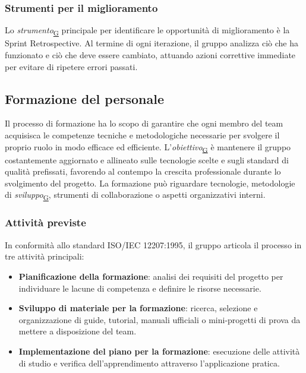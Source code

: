 \documentclass[a4paper,12pt]{article}
\begin{document}
        \subsubsection{Strumenti per il miglioramento}
        Lo \textit{strumento}\textsubscript{\href{https://atlasteam9.github.io/Atlas/glossario.html\#Strumento}{G}} principale per identificare le opportunità di miglioramento è la Sprint Retrospective. Al termine di ogni iterazione, il gruppo analizza ciò che ha funzionato e ciò che deve essere cambiato, attuando azioni correttive immediate per evitare di ripetere errori passati.
        
    \subsection{Formazione del personale}
        Il processo di formazione ha lo scopo di garantire che ogni membro del team acquisisca le competenze tecniche e metodologiche necessarie per svolgere il proprio ruolo in modo efficace ed efficiente. L'\textit{obiettivo}\textsubscript{\href{https://atlasteam9.github.io/Atlas/glossario.html\#Obiettivo}{G}} è mantenere il gruppo costantemente aggiornato e allineato sulle tecnologie scelte e sugli standard di qualità prefissati, favorendo al contempo la crescita professionale durante lo svolgimento del progetto. La formazione può riguardare tecnologie, metodologie di \textit{sviluppo}\textsubscript{\href{https://atlasteam9.github.io/Atlas/glossario.html\#Sviluppo}{G}}, strumenti di collaborazione o aspetti organizzativi interni.

        \subsubsection{Attività previste}
             In conformità allo standard ISO/IEC 12207:1995, il gruppo articola il processo in tre attività principali:
             \begin{itemize}
                 \item \textbf{Pianificazione della formazione}: analisi dei requisiti del progetto per individuare le lacune di competenza e definire le risorse necessarie.
                 \item \textbf{Sviluppo di materiale per la formazione}: ricerca, selezione e organizzazione di guide, tutorial, manuali ufficiali o mini-progetti di prova da mettere a disposizione del team.
                 \item \textbf{Implementazione del piano per la formazione}: esecuzione delle attività di studio e verifica dell'apprendimento attraverso l'applicazione pratica.
             \end{itemize}
\end{document}
